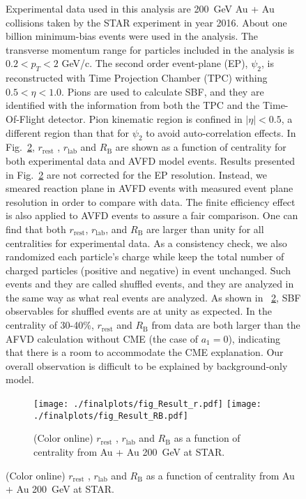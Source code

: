 \begin{figure}[htbp]
Experimental data used in this analysis are 200~GeV Au + Au collisions taken by the STAR  experiment in year 2016. About one billion minimum-bias events were used in the analysis.
The transverse momentum range for particles included in the analysis is $0.2 < p_T < 2 $ GeV/c. The second order event-plane  (EP), $\psi _{2}$, is reconstructed with Time Projection Chamber (TPC) withing $ 0.5< \eta <1.0$. Pions are used to calculate SBF, and they are identified with the information from both the TPC and the Time-Of-Flight detector. Pion kinematic region is confined in $|\eta| <0.5$, a different region than that for $\psi _{2}$ to avoid auto-correlation effects. In Fig.~\ref{fig:finalresults}, $r_{\mathrm{rest}}$ , $r_{\mathrm{lab}}$  and  $R_{\mathrm{B}}$ are shown as a function of centrality for both experimental data and AVFD model events. Results presented in Fig.~\ref{fig:finalresults}  are not corrected for the EP resolution. Instead, we smeared reaction plane in AVFD events with measured  event plane resolution in order to compare with data. The finite efficiency effect is also applied to AVFD events to assure a fair comparison.  One can find that both $r_{\mathrm{rest}}$, $r_{\mathrm{lab}}$, and $R_{\mathrm{B}}$ are larger than unity for all centralities for experimental data. As a consistency check, we also randomized each particle's charge while keep the total number of charged particles (positive and negative) in event unchanged. Such events and they are called shuffled events, and they are analyzed in the same way as what real events are analyzed. As shown in ~\ref{fig:finalresults}, SBF observables for shuffled events are at unity as expected. In the centrality of  30-40\%,  $r_{\mathrm{rest}}$ and $R_{\mathrm{B}}$ from data are both larger than the AFVD calculation without CME (the case of $a_1 =0$), indicating that there is a room to accommodate the CME explanation. Our overall observation is difficult to be explained by background-only model.


\begin{figure}[htbp!]
	\centering
	\texttt{[image: ./finalplots/fig\_Result\_r.pdf]}
	\texttt{[image: ./finalplots/fig\_Result\_RB.pdf]}
	\vspace{-0.7cm}
	\caption{(Color online) 
	$r_{\mathrm{rest}}$ , $r_{\mathrm{lab}}$  and  $R_{\mathrm{B}}$ as a function of centrality from Au + Au 200~GeV at STAR.
	}
	\label{fig:finalresults}
\end{figure}


\end{figure}
